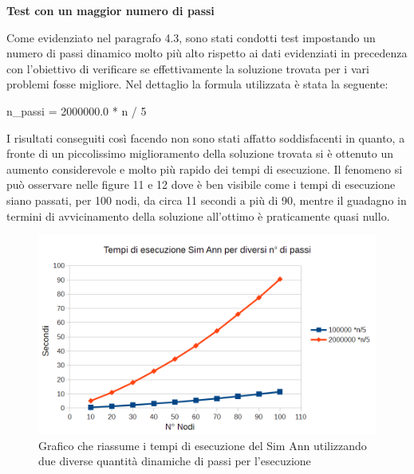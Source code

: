 \documentclass[preprint,12pt]{elsarticle}
\begin{document}
{\large \textbf{Test con un maggior numero di passi}}

Come evidenziato nel paragrafo 4.3, sono stati condotti test impostando un numero di passi dinamico molto più alto rispetto ai dati evidenziati in precedenza con l'obiettivo di verificare se effettivamente la soluzione trovata per i vari problemi fosse migliore. Nel dettaglio la formula utilizzata è stata la seguente:

\begin{center}
n\_passi = 2000000.0 * n / 5
\end{center}

I risultati conseguiti così facendo non sono stati affatto soddisfacenti in quanto, a fronte di un piccolissimo miglioramento della soluzione trovata si è ottenuto un aumento considerevole e molto più rapido dei tempi di esecuzione. Il fenomeno si può osservare nelle figure 11 e 12 dove è ben visibile come i tempi di esecuzione siano passati, per 100 nodi, da circa 11 secondi a più di 90, mentre il guadagno in termini di avvicinamento della soluzione all'ottimo è praticamente quasi nullo.\\

\begin{figure}[htbp]
\centering
\includegraphics[scale=0.50]{grafici_confronti/confronto_tempi_passi.png} 
\caption{Grafico che riassume i tempi di esecuzione del Sim Ann utilizzando due diverse quantità dinamiche di passi per l'esecuzione}\label{fig:10}
\end{figure}
\end{document}
